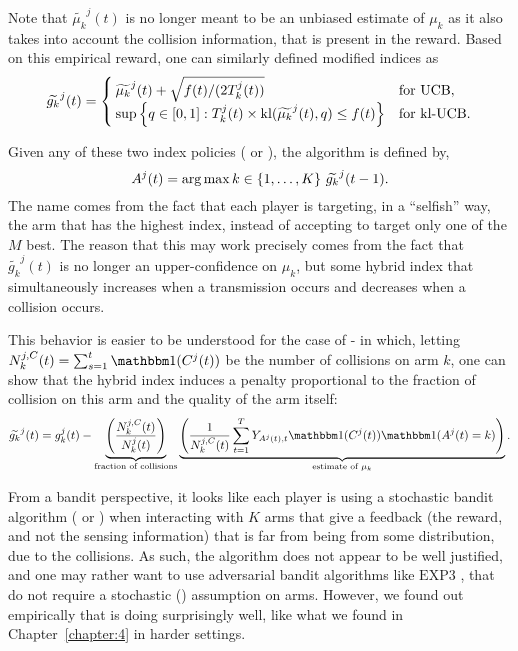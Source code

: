 Note that $\widetilde{\mu_k}^j(t)$ is no longer meant to be an unbiased estimate of $\mu_k$ as it also takes into account the collision information, that is present in the reward. Based on this empirical reward, one can similarly defined modified indices as
%
\begin{equation}\label{eq:5:indexTilde}
  \widetilde{g_k}^j(t) = \begin{cases}
      \widetilde{\mu_k}^j(t)  + \sqrt{  f(t) / (2T_k^j(t))}
      &\text{for } \mathrm{UCB}, \\
      \sup\left\{ q \in [0, 1]: T_k^j(t)\times \mathrm{kl}(\widetilde{\mu_k}^j(t), q) \leq f(t) \right\}
      &\text{for } \mathrm{kl}\text{-}\mathrm{UCB}.
  \end{cases}
\end{equation}

Given any of these two index policies (\UCB{} or \klUCB), the \Selfish{} algorithm is defined by,
%
\begin{equation}
  A^j(t) = \operatorname*{arg\,max}{ k \in \{1,\dots,K\}} \ \widetilde{g_k}^j(t-1).\label{algo:5:Selfish}
\end{equation}
The name comes from the fact that each player is targeting, in a ``selfish'' way, the arm that has the highest index, instead of accepting to target only one of the $M$ best.
The reason that this may work precisely comes from the fact that $\widetilde{g_k}^j(t)$ is no longer an upper-confidence on $\mu_k$,
but some hybrid index that simultaneously increases when a transmission occurs and decreases when a collision occurs.

This behavior is easier to be understood for the case of \Selfish-\UCB{} in which, letting $N_k^{j,C}(t) = \sum_{s=1}^t \indic(C^j(t))$ be the number of collisions on arm $k$, one can show that the hybrid \Selfish{} index induces a penalty proportional to the fraction of collision on this arm and the quality of the arm itself:
\begin{equation}
  \widetilde{g_k}^j(t) = g_k^j(t) -
  \underbrace{\left(\frac{N_k^{j,C}(t)}{N_k^j(t)}\right)}_{\text{fraction of collisions}}
  \underbrace{\left(\frac{1}{N_k^{j,C}(t)}\sum_{t=1}^{T}Y_{A^j(t),t} \indic(C^j(t)) \indic(A^j(t) = k)\right)}_{\text{estimate of } \mu_k }.
\end{equation}

From a bandit perspective, it looks like each player is using a stochastic bandit algorithm (\UCB{} or \klUCB) when interacting with $K$ arms that give a feedback (the reward, and not the sensing information) that is far from being \iid{} from some distribution, due to the collisions.
%
As such, the algorithm does not appear to be well justified, and one may rather want to use adversarial bandit algorithms like $\mathrm{EXP3}$ \citep{Auer02NonStochastic}, that do not require a stochastic (\iid) assumption on arms.
%
However, we found out empirically that \Selfish{} is doing surprisingly well,
like what we found in Chapter~\ref{chapter:4} in harder settings.

